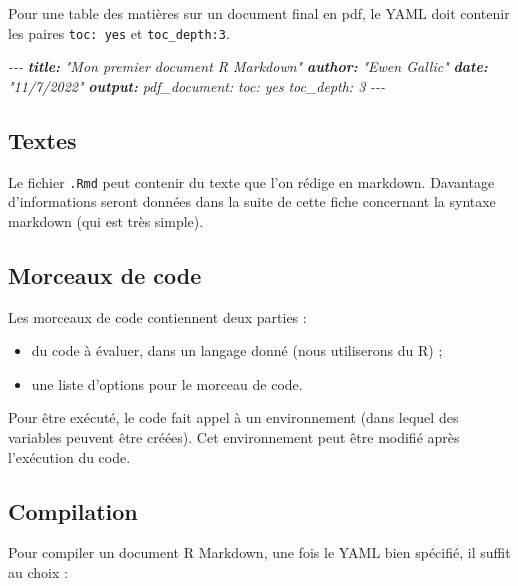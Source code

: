 \documentclass[
  11pt,
]{book}
\newenvironment{Shaded}{\begin{snugshade}}{\end{snugshade}}
\newcommand{\AnnotationTok}[1]{\textcolor[rgb]{0.56,0.35,0.01}{\textbf{\textit{#1}}}}
\newcommand{\CommentTok}[1]{\textcolor[rgb]{0.56,0.35,0.01}{\textit{#1}}}
\providecommand{\tightlist}{%
  \setlength{\itemsep}{0pt}\setlength{\parskip}{0pt}}
\numberwithin{equation}{section}
\numberwithin{countremarque}{section}
\begin{document}
Pour une table des matières sur un document final en pdf, le YAML doit contenir les paires \texttt{toc:\ yes} et \texttt{toc\_depth:3}.

\begin{Shaded}
\begin{Highlighting}[]
\CommentTok{{-}{-}{-}}
\AnnotationTok{title:}\CommentTok{ "Mon premier document R Markdown"}
\AnnotationTok{author:}\CommentTok{ "Ewen Gallic"}
\AnnotationTok{date:}\CommentTok{ "11/7/2022"}
\AnnotationTok{output:}\CommentTok{ pdf\_document:}
\CommentTok{    toc: yes}
\CommentTok{    toc\_depth: 3}
\CommentTok{{-}{-}{-}}
\end{Highlighting}
\end{Shaded}

\hypertarget{textes}{%
\subsection{Textes}\label{textes}}

Le fichier \texttt{.Rmd} peut contenir du texte que l'on rédige en markdown. Davantage d'informations seront données dans la suite de cette fiche concernant la syntaxe markdown (qui est très simple).

\hypertarget{morceaux-de-code}{%
\subsection{Morceaux de code}\label{morceaux-de-code}}

Les morceaux de code contiennent deux parties :

\begin{itemize}
\tightlist
\item
  du code à évaluer, dans un langage donné (nous utiliserons du R) ;
\item
  une liste d'options pour le morceau de code.
\end{itemize}

Pour être exécuté, le code fait appel à un environnement (dans lequel des variables peuvent être créées). Cet environnement peut être modifié après l'exécution du code.

\hypertarget{compilation}{%
\subsection{Compilation}\label{compilation}}

Pour compiler un document R Markdown, une fois le YAML bien spécifié, il suffit au choix :
\end{document}
